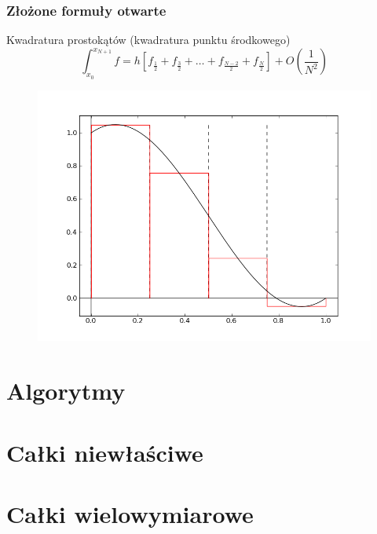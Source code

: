 \documentclass[compress,red]{beamer}
\begin{document}
	\begin{frame}
		\frametitle{Złożone formuły otwarte}
		
		Kwadratura prostokątów (kwadratura punktu środkowego)
		\[
		\int_{x_0}^{x_{N+1}} f = h \left[ f_\frac{1}{2} + f_\frac{3}{2} +  \ldots + f_\frac{N-2}{2} + f_\frac{N}{2} \right]
		 + O(\frac{1}{N^2})\]

		\begin{figure}
			\includegraphics[scale=0.3]{./img/q_rect2}
		\end{figure}
	\end{frame}	
	
\section{Algorytmy}	
	
\section{Całki niewłaściwe}
	
\section{Całki wielowymiarowe}

\end{document}
